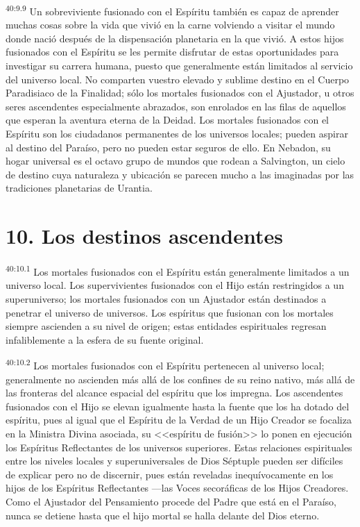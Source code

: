 \par
\textsuperscript{40:9.9} Un sobreviviente fusionado con el Espíritu también es capaz de aprender muchas cosas sobre la vida que vivió en la carne volviendo a visitar el mundo donde nació después de la dispensación planetaria en la que vivió. A estos hijos fusionados con el Espíritu se les permite disfrutar de estas oportunidades para investigar su carrera humana, puesto que generalmente están limitados al servicio del universo local. No comparten vuestro elevado y sublime destino en el Cuerpo Paradisiaco de la Finalidad; sólo los mortales fusionados con el Ajustador, u otros seres ascendentes especialmente abrazados, son enrolados en las filas de aquellos que esperan la aventura eterna de la Deidad. Los mortales fusionados con el Espíritu son los ciudadanos permanentes de los universos locales; pueden aspirar al destino del Paraíso, pero no pueden estar seguros de ello. En Nebadon, su hogar universal es el octavo grupo de mundos que rodean a Salvington, un cielo de destino cuya naturaleza y ubicación se parecen mucho a las imaginadas por las tradiciones planetarias de Urantia.

\section*{10. Los destinos ascendentes}
\par
\textsuperscript{40:10.1} Los mortales fusionados con el Espíritu están generalmente limitados a un universo local. Los supervivientes fusionados con el Hijo están restringidos a un superuniverso; los mortales fusionados con un Ajustador están destinados a penetrar el universo de universos. Los espíritus que fusionan con los mortales siempre ascienden a su nivel de origen; estas entidades espirituales regresan infaliblemente a la esfera de su fuente original.

\par
\textsuperscript{40:10.2} Los mortales fusionados con el Espíritu pertenecen al universo local; generalmente no ascienden más allá de los confines de su reino nativo, más allá de las fronteras del alcance espacial del espíritu que los impregna. Los ascendentes fusionados con el Hijo se elevan igualmente hasta la fuente que los ha dotado del espíritu, pues al igual que el Espíritu de la Verdad de un Hijo Creador se focaliza en la Ministra Divina asociada, su <<espíritu de fusión>> lo ponen en ejecución los Espíritus Reflectantes de los universos superiores. Estas relaciones espirituales entre los niveles locales y superuniversales de Dios Séptuple pueden ser difíciles de explicar pero no de discernir, pues están reveladas inequívocamente en los hijos de los Espíritus Reflectantes ---las Voces secoráficas de los Hijos Creadores. Como el Ajustador del Pensamiento procede del Padre que está en el Paraíso, nunca se detiene hasta que el hijo mortal se halla delante del Dios eterno.

